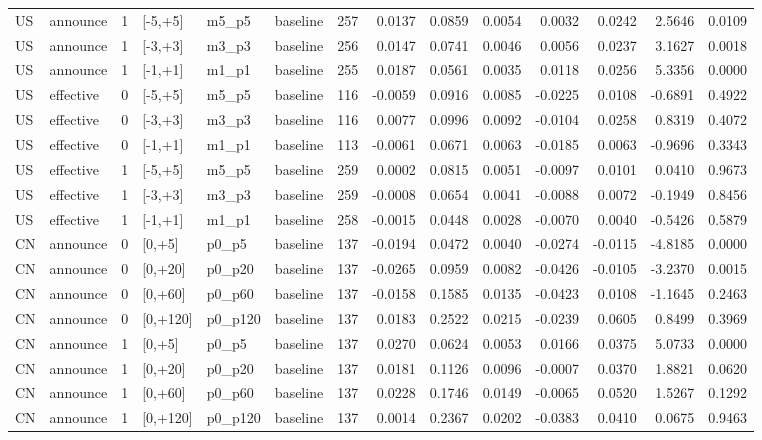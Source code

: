 \begin{tabular}{llrlllrrrrrrrr}
US & announce & 1 & [-5,+5] & m5_p5 & baseline & 257 & 0.0137 & 0.0859 & 0.0054 & 0.0032 & 0.0242 & 2.5646 & 0.0109 \\
US & announce & 1 & [-3,+3] & m3_p3 & baseline & 256 & 0.0147 & 0.0741 & 0.0046 & 0.0056 & 0.0237 & 3.1627 & 0.0018 \\
US & announce & 1 & [-1,+1] & m1_p1 & baseline & 255 & 0.0187 & 0.0561 & 0.0035 & 0.0118 & 0.0256 & 5.3356 & 0.0000 \\
US & effective & 0 & [-5,+5] & m5_p5 & baseline & 116 & -0.0059 & 0.0916 & 0.0085 & -0.0225 & 0.0108 & -0.6891 & 0.4922 \\
US & effective & 0 & [-3,+3] & m3_p3 & baseline & 116 & 0.0077 & 0.0996 & 0.0092 & -0.0104 & 0.0258 & 0.8319 & 0.4072 \\
US & effective & 0 & [-1,+1] & m1_p1 & baseline & 113 & -0.0061 & 0.0671 & 0.0063 & -0.0185 & 0.0063 & -0.9696 & 0.3343 \\
US & effective & 1 & [-5,+5] & m5_p5 & baseline & 259 & 0.0002 & 0.0815 & 0.0051 & -0.0097 & 0.0101 & 0.0410 & 0.9673 \\
US & effective & 1 & [-3,+3] & m3_p3 & baseline & 259 & -0.0008 & 0.0654 & 0.0041 & -0.0088 & 0.0072 & -0.1949 & 0.8456 \\
US & effective & 1 & [-1,+1] & m1_p1 & baseline & 258 & -0.0015 & 0.0448 & 0.0028 & -0.0070 & 0.0040 & -0.5426 & 0.5879 \\
CN & announce & 0 & [0,+5] & p0_p5 & baseline & 137 & -0.0194 & 0.0472 & 0.0040 & -0.0274 & -0.0115 & -4.8185 & 0.0000 \\
CN & announce & 0 & [0,+20] & p0_p20 & baseline & 137 & -0.0265 & 0.0959 & 0.0082 & -0.0426 & -0.0105 & -3.2370 & 0.0015 \\
CN & announce & 0 & [0,+60] & p0_p60 & baseline & 137 & -0.0158 & 0.1585 & 0.0135 & -0.0423 & 0.0108 & -1.1645 & 0.2463 \\
CN & announce & 0 & [0,+120] & p0_p120 & baseline & 137 & 0.0183 & 0.2522 & 0.0215 & -0.0239 & 0.0605 & 0.8499 & 0.3969 \\
CN & announce & 1 & [0,+5] & p0_p5 & baseline & 137 & 0.0270 & 0.0624 & 0.0053 & 0.0166 & 0.0375 & 5.0733 & 0.0000 \\
CN & announce & 1 & [0,+20] & p0_p20 & baseline & 137 & 0.0181 & 0.1126 & 0.0096 & -0.0007 & 0.0370 & 1.8821 & 0.0620 \\
CN & announce & 1 & [0,+60] & p0_p60 & baseline & 137 & 0.0228 & 0.1746 & 0.0149 & -0.0065 & 0.0520 & 1.5267 & 0.1292 \\
CN & announce & 1 & [0,+120] & p0_p120 & baseline & 137 & 0.0014 & 0.2367 & 0.0202 & -0.0383 & 0.0410 & 0.0675 & 0.9463 \\

\end{tabular}
